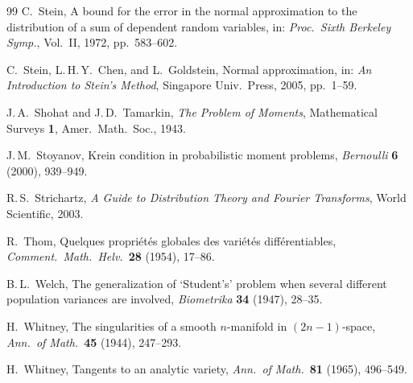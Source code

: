 \documentclass[11pt,a4paper]{article}
\begin{document}
\begin{thebibliography}{99}
C.~Stein,
A bound for the error in the normal approximation to the distribution
of a sum of dependent random variables,
in: \emph{Proc.\ Sixth Berkeley Symp.}, Vol.~II, 1972, pp.~583--602.

C.~Stein, L.\,H.\,Y.~Chen, and L.~Goldstein,
Normal approximation,
in: \emph{An Introduction to Stein's Method},
Singapore Univ.\ Press, 2005, pp.~1--59.

J.\,A.~Shohat and J.\,D.~Tamarkin,
\emph{The Problem of Moments},
Mathematical Surveys \textbf{1},
Amer.\ Math.\ Soc., 1943.

J.\,M.~Stoyanov,
Krein condition in probabilistic moment problems,
\emph{Bernoulli} \textbf{6} (2000), 939--949.

R.\,S.~Strichartz,
\emph{A Guide to Distribution Theory and Fourier Transforms},
World Scientific, 2003.

R.~Thom,
Quelques propri\'et\'es globales des vari\'et\'es diff\'erentiables,
\emph{Comment.\ Math.\ Helv.}\ \textbf{28} (1954), 17--86.

B.\,L.~Welch,
The generalization of `Student's' problem when several different
population variances are involved,
\emph{Biometrika} \textbf{34} (1947), 28--35.

H.~Whitney,
The singularities of a smooth $n$-manifold in $(2n-1)$-space,
\emph{Ann.\ of Math.}\ \textbf{45} (1944), 247--293.

H.~Whitney,
Tangents to an analytic variety,
\emph{Ann.\ of Math.}\ \textbf{81} (1965), 496--549.

\end{thebibliography}
\end{document}
